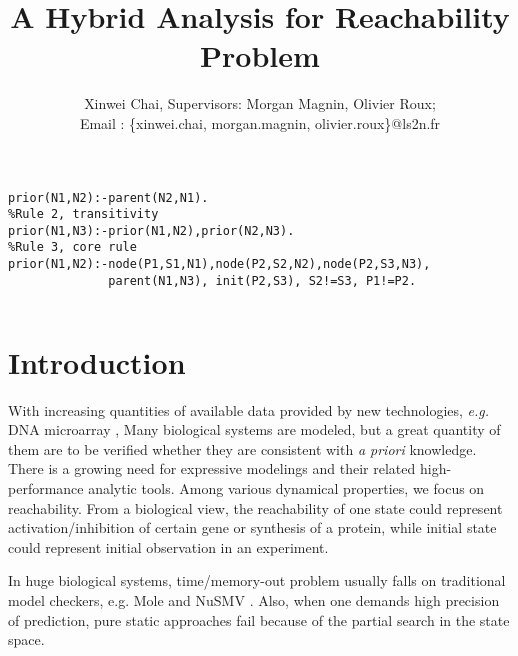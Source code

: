 \documentclass[final]{beamer}
\title{%
  \Huge{\textbf{A Hybrid Analysis for Reachability Problem}}
}
\author{%
  Xinwei Chai, Supervisors: Morgan Magnin, Olivier Roux; \texorpdfstring{\\ Email : \{xinwei.chai, morgan.magnin, olivier.roux\}@ls2n.fr}{}}
\institute{%
  Sp\'{e}cialit\'{e} : Informatique\\ %
  Laboratoire : LS2N\\         %
  \'{E}quipe : MéForBio                 %
}
\begin{document}
\newsavebox{\myLst}
\begin{lrbox}{\myLst}
\begin{lstlisting}[frame=L]
% Rule 1, a node appears always earlier than its predecessor
prior(N1,N2):-parent(N2,N1).
%Rule 2, transitivity
prior(N1,N3):-prior(N1,N2),prior(N2,N3).
%Rule 3, core rule
prior(N1,N2):-node(P1,S1,N1),node(P2,S2,N2),node(P2,S3,N3),
              parent(N1,N3), init(P2,S3), S2!=S3, P1!=P2. 
\end{lstlisting}
\end{lrbox}

\begin{frame}[t]{}

\begin{columns}[t]

\begin{column}{.45\linewidth}

\section{Introduction}
With increasing quantities of available data provided by new technologies, \textit{e.g.} DNA microarray \cite{marx2013}, Many biological systems are modeled, but a great quantity of them are to be verified whether they are consistent with \textit{a priori} knowledge. 
There is a growing need for expressive modelings and their related high-performance analytic tools. Among various dynamical properties, we focus on reachability. From a biological view, the reachability of one state could represent activation/inhibition of certain gene or synthesis of a protein, while initial state could represent initial observation in an experiment.

In huge biological systems, time/memory-out problem usually falls on traditional model checkers, e.g. Mole \cite{chatain2014characterization} and NuSMV \cite{cimatti2000nusmv}. 
Also, when one demands high precision of prediction, pure static approaches fail because of the partial search in the state space.


\end{column}
\end{columns}
\end{frame}
\end{document}
